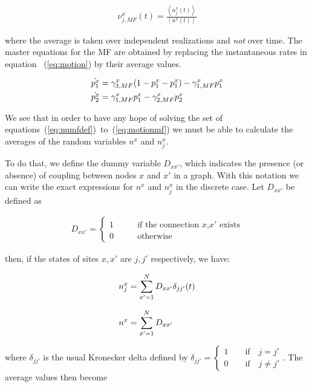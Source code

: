 \begin{align}
    \nu^x_{j,MF}(t) = \frac{\left< n^x_j(t) \right>}{\left< n^x(t) \right>}
    \label{eq:numfdef}
\end{align}

\noindent where the average is taken over independent realizations and \textit{not} over time. The master equations for the MF are
obtained by replacing the instantaneous rates in equation~ (\ref{eq:motion}) by their average values.

\begin{align}
    \dot{p^x_1} &= \gamma^x_{3,MF} (1-p^x_1-p^x_1) - \gamma^x_{1,MF} p^x_1 \notag \\
    \dot{p^x_2} &= \gamma^x_{1,MF}  p^x_1 - \gamma^x_{2,MF} p^x_2
    \label{eq:motionmf}
\end{align}

We see that in order to have any hope of solving the set of equations~(\ref{eq:numfdef})~to~(\ref{eq:motionmf}) we must be able to
calculate the averages of the random variables $n^x$ and $n^x_j$.

To do that, we define the dummy variable $D_{xx'}$, which indicates the presence (or absence) of coupling between nodes $x$ and $x'$ in
a graph. With this notation we can write the exact expressions for $n^x$ and $n^x_j$ in the discrete case. Let $D_{xx'}$ be defined as

\begin{align}
    D_{xx'} = 
    \begin{cases}
        1 \qquad &\text{if the connection $x$,$x'$ exists}\\
        0 \qquad &\text{otherwise}
    \end{cases}
\end{align}

\noindent then, if the states of sites $x,x'$ are $j,j'$ respectively, we have:

\begin{align}
    n^x_j &= \sum\limits_{x'=1}^ND_{xx'}\delta_{jj'}(t) \notag\\[8pt]
    n^x &= \sum\limits_{x'=1}^ND_{xx'}
\end{align}

\noindent where $\delta_{jj'}$ is the usual Kronecker delta defined by $\delta_{jj'}=\begin{cases}1 \qquad\text{if}\quad j=j'\\0 \qquad
\text{if}\quad j\neq j'\end{cases}$. The average values then become

